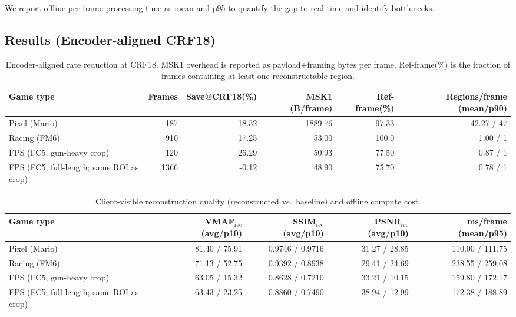 We report offline per-frame processing time as mean and p95 to quantify the gap to real-time and identify bottlenecks.

\subsection{Results (Encoder-aligned CRF18)}
\label{sec:evaluation:results:crf18}

\begin{table}[h]
\centering
\small
\begin{tabular}{lrrrrr}
\hline
Game type & Frames & Save@CRF18(\%) & MSK1 (B/frame) & Ref-frame(\%) & Regions/frame (mean/p90) \\
\hline
Pixel (Mario) & 187 & 18.32 & 1889.76 & 97.33 & 42.27 / 47 \\
Racing (FM6)  & 910 & 17.25 & 53.00   & 100.0 & 1.00 / 1 \\
FPS (FC5, gun-heavy crop) & 120 & 26.29 & 50.93 & 77.50 & 0.87 / 1 \\
FPS (FC5, full-length; same ROI as crop) & 1366 & -0.12 & 48.90 & 75.70 & 0.78 / 1 \\
\hline
\end{tabular}
\caption{Encoder-aligned rate reduction at CRF18. MSK1 overhead is reported as payload+framing bytes per frame. Ref-frame(\%) is the fraction of frames containing at least one reconstructable region.}
\label{tab:eval-bw}
\end{table}

\begin{table}[h]
\centering
\small
\begin{tabular}{lrrrr}
\hline
Game type & VMAF$_{\text{rec}}$ (avg/p10) & SSIM$_{\text{rec}}$ (avg/p10) & PSNR$_{\text{rec}}$ (avg/p10) & ms/frame (mean/p95) \\
\hline
Pixel (Mario) & 81.40 / 75.91 & 0.9746 / 0.9716 & 31.27 / 28.85 & 110.00 / 111.75 \\
Racing (FM6)  & 71.13 / 52.75 & 0.9392 / 0.8938 & 29.41 / 24.69 & 238.55 / 259.08 \\
FPS (FC5, gun-heavy crop) & 63.05 / 15.32 & 0.8628 / 0.7210 & 33.21 / 10.15 & 159.80 / 172.17 \\
FPS (FC5, full-length; same ROI as crop) & 63.43 / 23.25 & 0.8860 / 0.7490 & 38.94 / 12.99 & 172.38 / 188.89 \\
\hline
\end{tabular}
\caption{Client-visible reconstruction quality (reconstructed vs.\ baseline) and offline compute cost.}
\label{tab:eval-quality}
\end{table}

